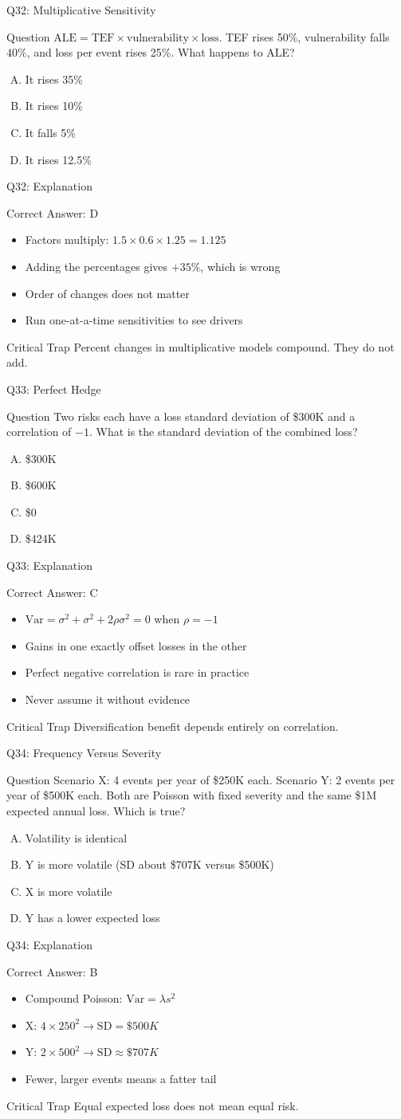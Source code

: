 \documentclass[aspectratio=169]{beamer}
\newcommand{\hq}[7]{%
  \begin{frame}{Q#1: #2}
    \begin{block}{Question}
      #3
    \end{block}
    \begin{enumerate}[(A)]
      #4
    \end{enumerate}
  \end{frame}
  \begin{frame}{Q#1: Explanation}
    \begin{block}{Correct Answer: #5}
      \begin{itemize}
        #6
      \end{itemize}
    \end{block}
    \begin{alertblock}{Critical Trap}
      #7
    \end{alertblock}
  \end{frame}
}
\begin{document}
\hq{32}{Multiplicative Sensitivity}
{$\text{ALE} = \text{TEF} \times \text{vulnerability} \times \text{loss}$. TEF rises 50\%, vulnerability falls 40\%, and loss per event rises 25\%. What happens to ALE?}
{\item It rises 35\%
 \item It rises 10\%
 \item It falls 5\%
 \item It rises 12.5\%}
{D}
{\item Factors multiply: $1.5 \times 0.6 \times 1.25 = 1.125$
 \item Adding the percentages gives $+35\%$, which is wrong
 \item Order of changes does not matter
 \item Run one-at-a-time sensitivities to see drivers}
{Percent changes in multiplicative models compound. They do not add.}

\hq{33}{Perfect Hedge}
{Two risks each have a loss standard deviation of \$300K and a correlation of $-1$. What is the standard deviation of the combined loss?}
{\item \$300K
 \item \$600K
 \item \$0
 \item \$424K}
{C}
{\item $\text{Var} = \sigma^2 + \sigma^2 + 2\rho\sigma^2 = 0$ when $\rho = -1$
 \item Gains in one exactly offset losses in the other
 \item Perfect negative correlation is rare in practice
 \item Never assume it without evidence}
{Diversification benefit depends entirely on correlation.}

\hq{34}{Frequency Versus Severity}
{Scenario X: 4 events per year of \$250K each. Scenario Y: 2 events per year of \$500K each. Both are Poisson with fixed severity and the same \$1M expected annual loss. Which is true?}
{\item Volatility is identical
 \item Y is more volatile (SD about \$707K versus \$500K)
 \item X is more volatile
 \item Y has a lower expected loss}
{B}
{\item Compound Poisson: $\text{Var} = \lambda s^2$
 \item X: $4 \times 250^2 \to \text{SD} = \$500K$
 \item Y: $2 \times 500^2 \to \text{SD} \approx \$707K$
 \item Fewer, larger events means a fatter tail}
{Equal expected loss does not mean equal risk.}
\end{document}
